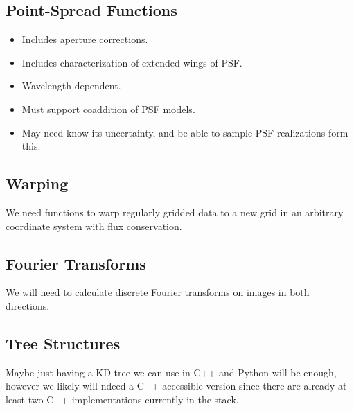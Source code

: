 \subsection{Point-Spread Functions}
\label{sec:spPSF}

\begin{itemize}
\item Includes aperture corrections.
\item Includes characterization of extended wings of PSF.
\item Wavelength-dependent.
\item Must support coaddition of PSF models.
\item May need know its uncertainty, and be able to sample PSF realizations form this.
\end{itemize}

\subsection{Warping}
\label{sec:spWarp}

We need functions to warp regularly gridded data to a new grid in an arbitrary coordinate system with flux conservation.

\subsection{Fourier Transforms}
\label{sec:spFourier}

We will need to calculate discrete Fourier transforms on images in both directions.

\subsection{Tree Structures}
\label{sec:spTrees}
Maybe just having a KD-tree we can use in C++ and Python will be enough, however we likely will ndeed a C++ accessible version since there are already at least two C++ implementations currently in the stack.


